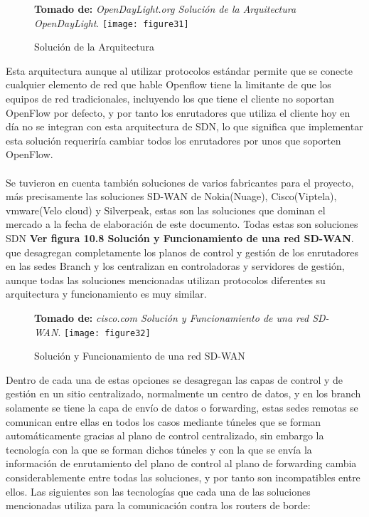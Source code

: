 \begin{figure}[htbp]
 \textbf{Tomado de:} \textit{OpenDayLight.org Solución de la Arquitectura OpenDayLight}.
  \centering
    {\texttt{[image: figure31]}}%
  \caption{Solución de la Arquitectura}
  \label{fig:fig2subfig}
\end{figure}

Esta arquitectura aunque al utilizar protocolos estándar permite que se conecte cualquier elemento de red que hable Openflow tiene la limitante de que los equipos de red tradicionales, incluyendo los que tiene el cliente no soportan OpenFlow por defecto, y por tanto los enrutadores que utiliza el cliente hoy en día no se integran con esta arquitectura de SDN, lo que significa que implementar esta solución requeriría cambiar todos los enrutadores por unos que soporten OpenFlow.
\\
\\
Se tuvieron en cuenta también soluciones de varios fabricantes para el proyecto, más precisamente las soluciones SD-WAN de Nokia(Nuage), Cisco(Viptela), vmware(Velo cloud) y Silverpeak, estas son las soluciones que dominan el mercado a la fecha de elaboración de este documento. Todas estas son soluciones SDN \textbf{Ver figura 10.8 Solución y Funcionamiento de una red SD-WAN}. que desagregan completamente los planos de control y gestión de los enrutadores en las sedes Branch y los centralizan en controladoras y servidores de gestión, aunque todas las soluciones mencionadas utilizan protocolos diferentes su arquitectura y funcionamiento es muy similar.
\begin{figure}[htbp]
 \textbf{Tomado de:} \textit{cisco.com Solución y Funcionamiento de una red SD-WAN}.
  \centering
    {\texttt{[image: figure32]}}%
  \caption{Solución y Funcionamiento de una red SD-WAN}
  \label{fig:fig2subfig}
\end{figure}
Dentro de cada una de estas opciones se desagregan las capas de control y de gestión en un sitio centralizado, normalmente un centro de datos, y en los branch solamente se tiene la capa de envío de datos o forwarding, estas sedes remotas se comunican entre ellas en todos los casos mediante túneles que se forman automáticamente gracias al plano de control centralizado, sin embargo la tecnología con la que se forman dichos túneles y con la que se envía la información de enrutamiento del plano de control al plano de forwarding cambia considerablemente entre todas las soluciones, y por tanto son incompatibles entre ellos. Las siguientes son las tecnologías que cada una de las soluciones mencionadas utiliza para la comunicación contra los routers de borde:
